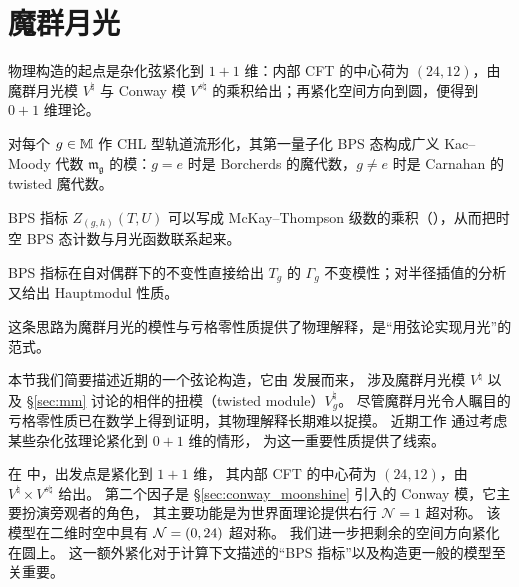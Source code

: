 \section{魔群月光}
\label{sec:physics_monstrous}

\begin{keytakeaways}
  \item 物理构造的起点是杂化弦紧化到 $1+1$ 维：内部 CFT 的中心荷为 $(24,12)$，由魔群月光模 $V^\natural$ 与 Conway 模 $V_{}^{s\natural}$ 的乘积给出；再紧化空间方向到圆，便得到 $0+1$ 维理论。
  \item 对每个 $g\in\mathbb{M}$ 作 CHL 型轨道流形化，其第一量子化 BPS 态构成广义 Kac–Moody 代数 $\mathfrak{m_g}$ 的模：$g=e$ 时是 Borcherds 的魔代数，$g\neq e$ 时是 Carnahan 的 twisted 魔代数。
  \item BPS 指标 $Z_{(g,h)}(T,U)$ 可以写成 McKay–Thompson 级数的乘积（），从而把时空 BPS 态计数与月光函数联系起来。
  \item BPS 指标在自对偶群下的不变性直接给出 $T_g$ 的 $\Gamma_g$ 不变模性；对半径插值的分析又给出 Hauptmodul 性质。
  \item 这条思路为魔群月光的模性与亏格零性质提供了物理解释，是“用弦论实现月光”的范式。
\end{keytakeaways}

本节我们简要描述近期的一个弦论构造，它由 \cite{paquette2016monstrous,Paquette:2017xui} 发展而来，
涉及魔群月光模 $V^\natural$ 以及 \S\ref{sec:mm} 讨论的相伴的扭模（twisted module）$V^\natural_g$。
尽管魔群月光令人瞩目的亏格零性质已在数学上得到证明，其物理解释长期难以捉摸。
近期工作 \cite{paquette2016monstrous,Paquette:2017xui} 通过考虑某些杂化弦理论紧化到 $0+1$ 维的情形，
为这一重要性质提供了线索。


在 \cite{paquette2016monstrous,Paquette:2017xui} 中，出发点是紧化到 $1+1$ 维，
其内部 CFT 的中心荷为 $(24,12)$，由 $V^\natural\times V_{}^{s\natural}$ 给出。
第二个因子是 \S\ref{sec:conway_moonshine} 引入的 Conway 模，它主要扮演旁观者的角色，
其主要功能是为世界面理论提供右行 $\mathcal{N}=1$ 超对称。
该模型在二维时空中具有 ${\cal N}=(0,24)$ 超对称。
我们进一步把剩余的空间方向紧化在圆上。
这一额外紧化对于计算下文描述的“BPS 指标”以及构造更一般的模型至关重要。


